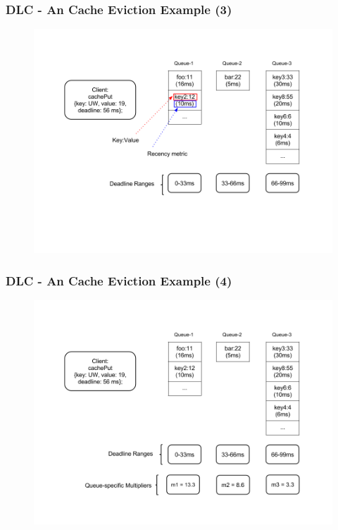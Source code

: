 \documentclass{beamer}
\begin{document}
\begin{frame}
  \frametitle{DLC - An Cache Eviction Example (3)}
  \begin{figure}
    \begin{center}
      \centerline{\includegraphics[scale=0.33]{img/DLC_NEW_3.png}}
    \end{center}
  \end{figure}
\end{frame}

\begin{frame}
  \frametitle{DLC - An Cache Eviction Example (4)}
  \begin{figure}
    \begin{center}
      \centerline{\includegraphics[scale=0.33]{img/DLC_NEW_4.png}}
    \end{center}
  \end{figure}
\end{frame}
\end{document}
